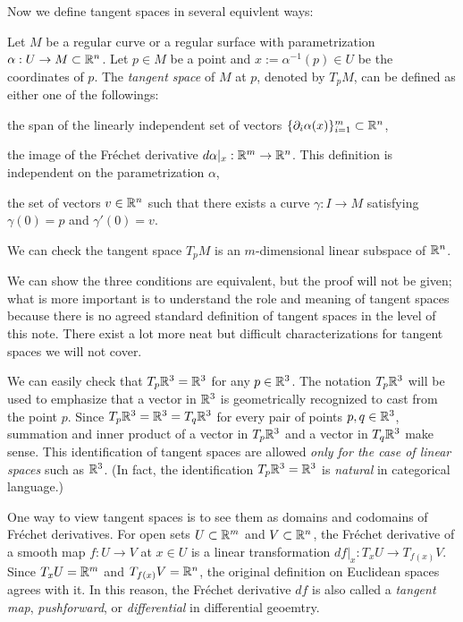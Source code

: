 \documentclass{../exp}
\def\a{\alpha}
\begin{document}
Now we define tangent spaces in several equivlent ways:
\begin{defn}
Let $M$ be a regular curve or a regular surface with parametrization $\a:U\to M\subset\R^n$.
Let $p\in M$ be a point and $x:=\a^{-1}(p)\in U$ be the coordinates of $p$.
The \emph{tangent space} of $M$ at $p$, denoted by $T_pM$, can be defined as either one of the followings:
\begin{cond}
\item the span of the linearly independent set of vectors $\{\pd_i\a(x)\}_{i=1}^m\subset\R^n$,
\item the image of the Fr\'echet derivative $d\a|_x:\R^m\to\R^n$.
This definition is independent on the parametrization $\a$,
\item the set of vectors $v\in\mathbb{R}^n$ such that there exists a curve $\gamma:I\to M$ satisfying $\gamma(0)=p$ and $\gamma'(0)=v$.
\end{cond}
We can check the tangent space $T_pM$ is an $m$-dimensional linear subspace of $\mathbb{R}^n$.
\end{defn}
\begin{rmk}
We can show the three conditions are equivalent, but the proof will not be given; what is more important is to understand the role and meaning of tangent spaces because there is no agreed standard definition of tangent spaces in the level of this note.
There exist a lot more neat but difficult characterizations for tangent spaces we will not cover.
\end{rmk}
\begin{rmk}
We can easily check that $T_p\mathbb{R}^3=\mathbb{R}^3$ for any $p\in\mathbb{R}^3$.
The notation $T_p\mathbb{R}^3$ will be used to emphasize that a vector in $\mathbb{R}^3$ is geometrically recognized to cast from the point $p$.
Since $T_p\mathbb{R}^3=\mathbb{R}^3=T_q\mathbb{R}^3$ for every pair of points $p,q\in\mathbb{R}^3$, summation and inner product of a vector in $T_p\mathbb{R}^3$ and a vector in $T_q\mathbb{R}^3$ make sense.
This identification of tangent spaces are allowed \emph{only for the case of linear spaces} such as $\mathbb{R}^3$.
(In fact, the identification $T_p\mathbb{R}^3=\mathbb{R}^3$ is \emph{natural} in categorical language.)
\end{rmk}
\begin{rmk}
One way to view tangent spaces is to see them as domains and codomains of Fr\'echet derivatives.
For open sets $U\subset\mathbb{R}^m$ and $V\subset\mathbb{R}^n$, the Fr\'echet derivative of a smooth map $f:U\to V$ at $x\in U$ is a linear transformation $df|_x:T_xU\to T_{f(x)}V$.
Since $T_xU=\mathbb{R}^m$ and $T_{f(x)}V=\mathbb{R}^n$, the original definition on Euclidean spaces agrees with it.
In this reason, the Fr\'echet derivative $df$ is also called a \emph{tangent map}, \emph{pushforward}, or \emph{differential} in differential geoemtry.
\end{rmk}
\end{document}

